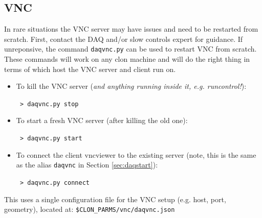 \documentclass[12pt]{article}
\begin{document}
\begin{appendix}
    \section{VNC}\label{sec:vnc}
In rare situations the VNC server may have issues and need to be restarted from scratch.  First, contact the DAQ and/or slow controls expert for guidance.  If unreponsive, the command \texttt{daqvnc.py} can be used to restart VNC from scratch.  These commands will work on any clon machine and will do the right thing in terms of which host the VNC server and client run on. 
\begin{itemize}
    \item To kill the VNC server ({\em and anything running inside it, e.g. runcontrol!}):

        \noindent\texttt{\hspace*{1cm} > daqvnc.py stop}\newline
    \item To start a fresh VNC server (after killing the old one):
    
        \noindent\texttt{\hspace*{1cm} > daqvnc.py start}\newline
    \item To connect the client vncviewer to the existing server (note, this is the same as the alias \texttt{daqvnc} in Section \ref{sec:daqstart}):

        \noindent\texttt{\hspace*{1cm} > daqvnc.py connect}\newline
\end{itemize}
This uses a single configuration file for the VNC setup (e.g. host, port, geometry), located at: \texttt{\$CLON\_PARMS/vnc/daqvnc.json}
\end{appendix}
\end{document}
